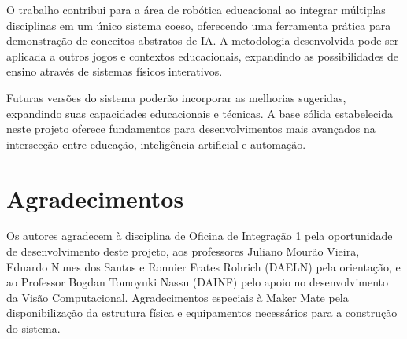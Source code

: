 \documentclass[a4paper]{ifacconf}
\begin{document}
\par\noindent O trabalho contribui para a área de robótica educacional ao integrar múltiplas disciplinas em um único sistema coeso, oferecendo uma ferramenta prática para demonstração de conceitos abstratos de IA. A metodologia desenvolvida pode ser aplicada a outros jogos e contextos educacionais, expandindo as possibilidades de ensino através de sistemas físicos interativos.

\par\noindent Futuras versões do sistema poderão incorporar as melhorias sugeridas, expandindo suas capacidades educacionais e técnicas. A base sólida estabelecida neste projeto oferece fundamentos para desenvolvimentos mais avançados na intersecção entre educação, inteligência artificial e automação.

\section*{Agradecimentos}
\par\noindent Os autores agradecem à disciplina de Oficina de Integração 1 pela oportunidade de desenvolvimento deste projeto, aos professores Juliano Mourão Vieira, Eduardo Nunes dos Santos e Ronnier Frates Rohrich (DAELN) pela orientação, e ao Professor Bogdan Tomoyuki Nassu (DAINF) pelo apoio no desenvolvimento da Visão Computacional. Agradecimentos especiais à Maker Mate pela disponibilização da estrutura física e equipamentos necessários para a construção do sistema.
\end{document}
